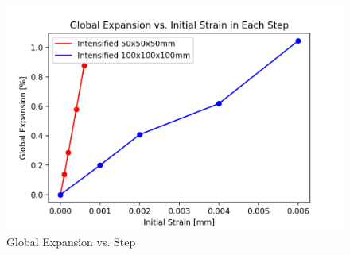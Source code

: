 \begin{figure}[ht!]
\centering
\includegraphics[width=.8\linewidth]{Files/exp_plot/DEFA30X0vsX-1_exp.png}
  \caption{Global Expansion vs. Step}
  \label{fig:DEFA30X0vsX-1_exp}
\end{figure}
